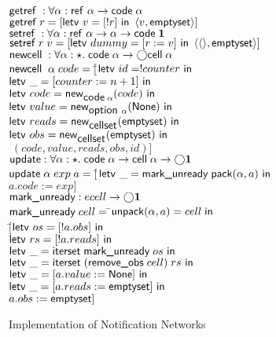 \documentclass[preprint,natbib]{sigplanconf}
\begin{document}
\begin{figure}
\begin{tabbing}
$\getref : \forall \alpha : \reftype{\alpha} \to \codetype{\alpha}$ \\
$\getref r = \comp{\letv{v}{\comp{!r}}{\pair{v}{\ctext{emptyset}}}}$ \\[1em]

$\setref : \forall \alpha : \reftype{\alpha} \to \alpha \to \codetype{\unittype}$ \\
$\setref r\;v = \comp{\letv{dummy}{\comp{r := v}}{\pair{\unit}{\ctext{emptyset}}}}$ \\[1em]

$\newcell : \forall \alpha:\star.\; \codetype{\alpha} \to \monad{\celltype{\alpha}}$ \\
$\newcell\;\alpha\;code = [$\=$\letv{id}{!counter}{}$ \\
                                   \>$\letv{\_}{\comp{counter := n + 1}}{}$ \\
                                   \>$\letv{code}{\newref{\codetype{\alpha}}{code}}{}$ \\
                                   \>$\letv{value}{\newref{\opttype{\alpha}}{\ctext{None}}}{}$ \\
                                   \>$\letv{reads}{\newref{\cellset}{\ctext{emptyset}}}{}$ \\
                                   \>$\letv{obs}{\newref{\cellset}{\ctext{emptyset}}}{}$ \\
                                   \>$\; (code, value, reads, obs, id)]$ \\[1em]

$\updatecell : \forall \alpha:\star.\; \codetype{\alpha} \to \celltype{\alpha} \to \monad{\unittype}$\\
$\updatecell\;\alpha\;exp\;a = 
     [$\=$\letv{\_}{\ctext{mark\_unready}\;\pack{\alpha}{a}}{}$ \\
       \>$a.code := exp]$ \\[1em]

$\ctext{mark\_unready} : ecell \to \monad{\unittype}$ \\
$\ctext{mark\_unready}\;cell =\; $\=$\ctext{unpack}(\alpha, a) = cell\; \ctext{in}$\\
\>  $[$\=$\letv{os}{\comp{!a.obs}}{}$ \\
\>     \>$\letv{rs}{\comp{!a.reads}}{}$ \\
\>     \>$\letv{\_}{\ctext{iterset}\;\ctext{mark\_unready}\;os}{}$ \\
\>     \>$\letv{\_}{\ctext{iterset}\;(\ctext{remove\_obs}\;cell)\;rs}{}$ \\
\>     \>$\letv{\_}{\comp{a.value := \ctext{None}}}{}$ \\
\>     \>$\letv{\_}{\comp{a.reads := \ctext{emptyset}}}{}$ \\
\>     \>$a.obs   := \ctext{emptyset}]$ 
\end{tabbing}
\caption{Implementation of Notification Networks}
\label{notification-implementation}
\end{figure}
\end{document}
